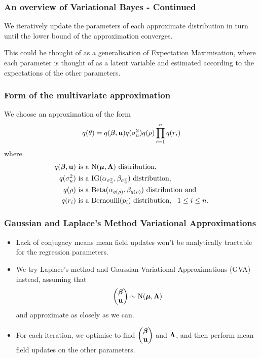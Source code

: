 \documentclass{beamer}
\begin{document}
\begin{frame}
	\frametitle{An overview of Variational Bayes - Continued}
	We iteratively update the parameters of each approximate distribution
	in turn until the lower bound of the approximation converges.
			
	\bigskip 
	This could be thought of as a generalisation of Expectation Maximisation, where each parameter is thought of as a latent
	variable and estimated according to the expectations of the other parameters.
\end{frame}


\begin{frame}
	\frametitle{Form of the multivariate approximation}
	We choose an approximation of the form
	$$
	q(\theta) = q({\boldsymbol \beta}, {\bf u}) q(\sigma_u^2) q(\rho) \prod_{i=1}^n q(r_i)
	$$
	where
	\begin{align*}
		q({\boldsymbol \beta}, {\bf u}) & \text{ is a } \text{N}({\boldsymbol \mu}, {\boldsymbol \Lambda}) \text{ distribution},                               \\
		q(\sigma_u^2)  & \text{ is a } \text{IG}(\alpha_{\sigma_u^2}, \beta_{\sigma_u^2}) \text{ distribution},     \\
		q(\rho)        & \text{ is a } \text{Beta}(\alpha_{q(\rho)}, \beta_{q(\rho)}) \text{ distribution} \text{ and} \\
		q(r_i)         & \text{ is a } \text{Bernoulli}(p_i) \text{ distribution}, \ \ 1 \leq i \leq n.                
	\end{align*}
\end{frame}

\begin{frame}
	\frametitle{Gaussian and Laplace's Method Variational Approximations}
	\begin{itemize}
		\item Lack of conjugacy means mean field updates won't be analytically tractable for the regression parameters.
		\item We try Laplace's method and Gaussian Variational Approximations (GVA) instead, assuming that
		      $$
		      \begin{pmatrix}
		      	{\boldsymbol\beta} \\
		      	{\bf u}    
		      \end{pmatrix}
		      \sim \text{N}({\boldsymbol \mu}, {\boldsymbol \Lambda})
		      $$
		      and approximate as closely as we can.
		\item For each iteration, we optimise to find
		      $\begin{pmatrix}
		      	{\boldsymbol\beta} \\
		      	{\bf u}    
		      \end{pmatrix}
		      $ and ${\boldsymbol \Lambda}$,
		      and then perform mean field updates on the other parameters.
	\end{itemize}
\end{frame}
\end{document}
